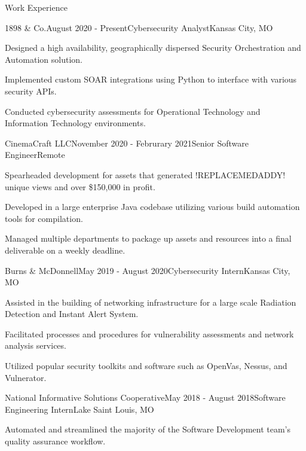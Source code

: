 \documentclass{resume}
\begin{document}
\begin{rSection}{Work Experience}
\begin{rSubsection}{1898 \& Co.}{August 2020 - Present}{Cybersecurity Analyst}{Kansas City, MO} 
    \item Designed a high availability, geographically dispersed Security Orchestration and Automation solution. 
    \item Implemented custom SOAR integrations using Python to interface with various security APIs.
    \item Conducted cybersecurity assessments for Operational Technology and Information Technology environments. 
\end{rSubsection} 
\begin{rSubsection}{CinemaCraft LLC}{November 2020 - Februrary 2021}{Senior Software Engineer}{Remote}
    \item Spearheaded development for assets that generated !REPLACEMEDADDY! unique views and over \$150,000 in profit. 
    \item Developed in a large enterprise Java codebase utilizing various build automation tools for compilation.
    \item Managed multiple departments to package up assets and resources into a final deliverable on a weekly deadline.
\end{rSubsection}
\begin{rSubsection}{Burns \& McDonnell}{May 2019 - August 2020}{Cybersecurity Intern}{Kansas City, MO}
    \item Assisted in the building of networking infrastructure for a large scale Radiation Detection and Instant Alert System. 
    \item Facilitated processes and procedures for vulnerability assessments and network analysis services. 
    \item Utilized popular security toolkits and software such as OpenVas, Nessus, and Vulnerator. 
\end{rSubsection}
\begin{rSubsection}{National Informative Solutions Cooperative}{May 2018 - August 2018}{Software Engineering Intern}{Lake Saint Louis, MO}
    \item Automated and streamlined the majority of the Software Development team's quality assurance workflow.  

\end{rSubsection}
\end{rSection}
\end{document}
